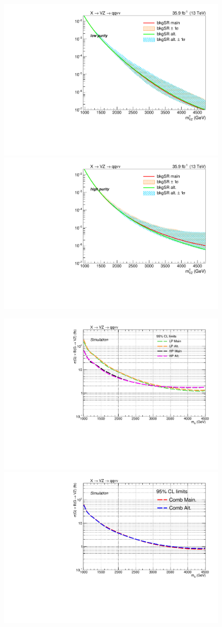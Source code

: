 \begin{figure}[!htb]
  \centering

    \includegraphics[width=.495\textwidth]{plotsAlpha_tesi/XVZnnlp/AlphaBiasSR.pdf}
    \includegraphics[width=.495\textwidth]{plotsAlpha_tesi/XVZnnhp/AlphaBiasSR.pdf}

    \includegraphics[width=.495\textwidth]{BackgroundFunctionValidation/Exclusion_XZZInv_main_vs_alt_LPHP_test.pdf}
    \includegraphics[width=.495\textwidth]{BackgroundFunctionValidation/Exclusion_XZZInv_main_vs_alt_comb_test.pdf}


\end{figure}
